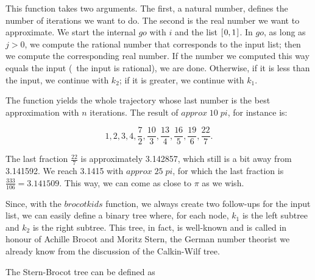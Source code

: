 \documentclass[tikz]{scrreprt}
\newcommand{\Varid}[1]{\mathit{#1}}
\begin{document}
This function takes two arguments.
The first, a natural number, 
defines the number of iterations we want to do.
The second is the real number we want to approximate.
We start the internal \ensuremath{\Varid{go}} with $i$ and the list \ensuremath{[\mskip1.5mu \mathrm{0},\mathrm{1}\mskip1.5mu]}.
In \ensuremath{\Varid{go}}, as long as $j > 0$, 
we compute the rational number that corresponds to the input list;
then we compute the corresponding real number.
If the number we computed this way
equals the input (\ie\ the input is rational),
we are done. Otherwise, if it is less than the input, 
we continue with $k_2$;
if it is greater, we continue with $k_1$.

The function yields the whole trajectory whose
last number is the best approximation with $n$ iterations.
The result of \ensuremath{\Varid{approx}\;\mathrm{10}\;\Varid{pi}}, for instance is:

\[
1,2,3,4,\frac{7}{2},
\frac{10}{3},
\frac{13}{4},
\frac{16}{5},
\frac{19}{6},
\frac{22}{7}.
\]

The last fraction $\frac{22}{7}$ is approximately
3.142857, which still is a bit away from 3.141592.
We reach 3.1415 with \ensuremath{\Varid{approx}\;\mathrm{25}\;\Varid{pi}}, for which 
the last fraction is $\frac{333}{106} = 3.141509$. 
This way, we can come as close to $\pi$ as we wish.

Since, with the \ensuremath{\Varid{brocotkids}} function, we always
create two follow-ups for the input list,
we can easily define a binary tree where, for each node,
$k_1$ is the left subtree and $k_2$ is the right subtree.
This tree, in fact, is well-known and is called 
 in honour of Achille Brocot and
Moritz Stern, the German number theorist we already know
from the discussion of the Calkin-Wilf tree.

The Stern-Brocot tree can be defined as
\end{document}
